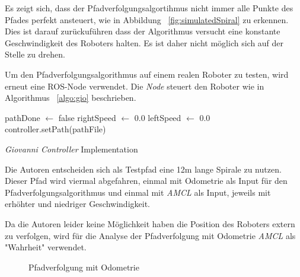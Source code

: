 \documentclass[11pt,a4paper]{article}
\begin{document}
{\begin{figure}[h]
\end{figure}
Es zeigt sich, dass der Pfadverfolgungsalgortihmus nicht immer alle Punkte des Pfades perfekt ansteuert, wie in Abbildung ~\ref{fig:simulatedSpiral} zu erkennen. Dies ist darauf zur\"uckuf\"uhren dass der Algorithmus versucht eine konstante Geschwindigkeit des Roboters halten. Es ist daher nicht m\"oglich sich auf der Stelle zu drehen.


\newpage
Um den Pfadverfolgungsalgorithmus auf einem realen Roboter zu testen, wird erneut eine ROS-Node verwendet. Die \textit{Node} steuert den Roboter wie in Algorithmus ~\ref{algo:gio} beschrieben.

\begin{algorithm}
	pathDone $\leftarrow$ false\;
	rightSpeed $\leftarrow$ 0.0\;
	leftSpeed $\leftarrow$ 0.0\;
	controller.setPath(pathFile)\;
\caption{\textit{Giovanni Controller} Implementation \label{algo:gio}}
\end{algorithm}

Die Autoren entscheiden sich als Testpfad eine 12m lange Spirale zu nutzen. Dieser Pfad wird viermal abgefahren, einmal mit Odometrie als Input f\"ur den Pfadverfolgungsalgorithmus und einmal mit \textit{AMCL} als Input, jeweils mit erh\"ohter und niedriger Geschwindigkeit.

Da die Autoren leider keine M\"oglichkeit haben die Position des Roboters extern zu verfolgen, wird f\"ur die Analyse der Pfadverfolgung mit Odometrie \textit{AMCL} als "Wahrheit" verwendet.
\newpage
\begin{figure}
	\centering
	\caption{Pfadverfolgung mit Odometrie}
\end{figure}

}
\end{document}
